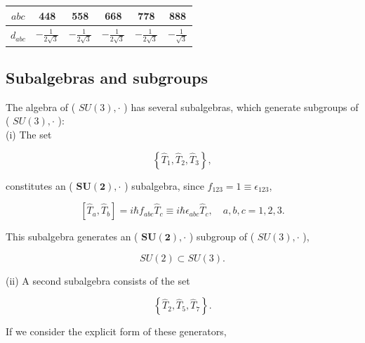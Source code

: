 \documentclass[10pt, letterpaper]{article}
\begin{document}
\begin{center}
\begin{tabular}{c||c|c|c|c|c}
$a b c$ & 448 & 558 & 668 & 778 & 888 \\
\hline
$d_{a b c}$ & $-\frac{1}{2 \sqrt{3}}$ & $-\frac{1}{2 \sqrt{3}}$ & $-\frac{1}{2 \sqrt{3}}$ & $-\frac{1}{2 \sqrt{3}}$ & $-\frac{1}{\sqrt{3}}$ \\
\hline
\end{tabular}
\end{center}

\subsection{Subalgebras and subgroups}
The algebra of ( $S U(3), \cdot$ ) has several subalgebras, which generate subgroups of ( $S U(3), \cdot$ ):\\
(i) The set

$$
\left\{\hat{T}_{1}, \hat{T}_{2}, \hat{T}_{3}\right\},
$$

constitutes an ( $\boldsymbol{S U}(\mathbf{2}), \cdot$ ) subalgebra, since $f_{123}=1 \equiv \epsilon_{123}$,

$$
\left[\hat{T}_{a}, \hat{T}_{b}\right]=i \hbar f_{a b c} \hat{T}_{c} \equiv i \hbar \epsilon_{a b c} \hat{T}_{c}, \quad a, b, c=1,2,3 .
$$

This subalgebra generates an ( $\boldsymbol{S U}(\mathbf{2}), \cdot$ ) subgroup of ( $S U(3), \cdot$ ),

$$
S U(2) \subset S U(3) .
$$

(ii) A second subalgebra consists of the set

$$
\left\{\hat{T}_{2}, \hat{T}_{5}, \hat{T}_{7}\right\} .
$$

If we consider the explicit form of these generators,
\end{document}
